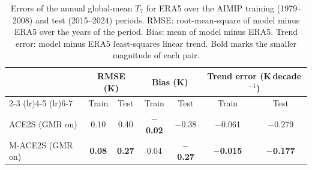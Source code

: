 \begin{table}[ht]
  \caption{Errors of the annual global-mean $T_7$ for ERA5 over the AIMIP training (1979--2008) and test (2015--2024) periods. RMSE: root-mean-square of model minus ERA5 over the years of the period. Bias: mean of model minus ERA5. Trend error: model minus ERA5 least-squares linear trend. Bold marks the smaller magnitude of each pair.}
  \label{table:t7_trend_1deg}
  \centering
  \small
  \begin{tabular}{lcccccc}
    \toprule
     & \multicolumn{2}{c}{RMSE (K)} & \multicolumn{2}{c}{Bias (K)} & \multicolumn{2}{c}{Trend error (K\,decade$^{-1}$)} \\
    \cmidrule(lr){2-3} \cmidrule(lr){4-5} \cmidrule(lr){6-7}
     & Train & Test & Train & Test & Train & Test \\
    \midrule
    ACE2S (GMR on) & 0.10 & 0.40 & \textbf{$-$0.02} & $-$0.38 & $-$0.061 & $-$0.279 \\
    M-ACE2S (GMR on) & \textbf{0.08} & \textbf{0.27} & 0.04 & \textbf{$-$0.27} & \textbf{$-$0.015} & \textbf{$-$0.177} \\
    \bottomrule
  \end{tabular}
\end{table}
